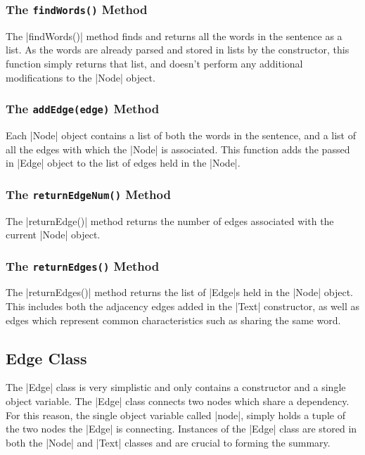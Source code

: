 	\subsubsection{The {\tt findWords()} Method}
	The |findWords()| method finds and returns all the words in the sentence as a list. As the words are already parsed and stored in lists by the constructor, this function simply returns that list, and doesn't perform any additional modifications to the |Node| object.
	
	\subsubsection{The {\tt addEdge(edge)} Method}	
	Each |Node| object contains a list of both the words in the sentence, and a list of all the edges with which the |Node| is associated. This function adds the passed in |Edge| object to the list of edges held in the |Node|.
	
	\subsubsection{The {\tt returnEdgeNum()} Method}
	The |returnEdge()| method returns the number of edges associated with the current |Node| object.
	
	\subsubsection{The {\tt returnEdges()} Method}
	The |returnEdges()| method returns the list of |Edge|s held in the |Node| object. This includes both the adjacency edges added in the |Text| constructor, as well as edges which represent common characteristics such as sharing the same word.
		
\subsection{Edge Class}
	
	The |Edge| class is very simplistic and only contains a constructor and a single object variable. The |Edge| class connects two nodes which share a dependency. For this reason, the single object variable called |node|, simply holds a tuple of the two nodes the |Edge| is connecting. Instances of the |Edge| class are stored in both the |Node| and |Text| classes and are crucial to forming the summary.
